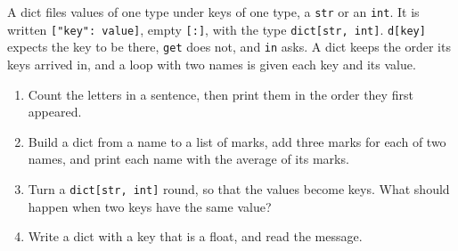 \begin{summary}
A dict files values of one type under keys of one type, a \verb|str|
or an \verb|int|. It is written \verb|["key": value]|, empty
\verb|[:]|, with the type \verb|dict[str, int]|. \verb|d[key]| expects
the key to be there, \verb|get| does not, and \verb|in| asks. A dict
keeps the order its keys arrived in, and a loop with two names is
given each key and its value.
\end{summary}

\begin{tryit}
\begin{enumerate}
\item Count the letters in a sentence, then print them in the order
  they first appeared.
\item Build a dict from a name to a list of marks, add three marks for
  each of two names, and print each name with the average of its marks.
\item Turn a \verb|dict[str, int]| round, so that the values become
  keys. What should happen when two keys have the same value?
\item Write a dict with a key that is a float, and read the message.
\end{enumerate}
\end{tryit}
